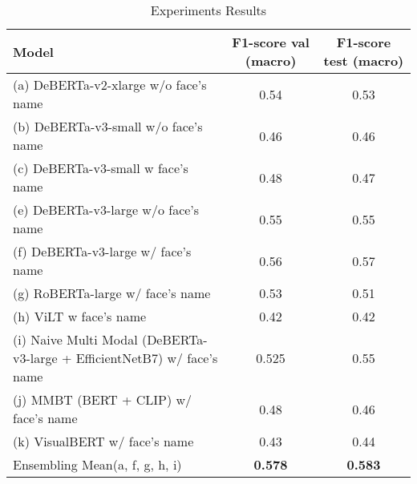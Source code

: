 \documentclass[11pt]{article}
\begin{document}
\begin{table*}
\centering
\begin{tabular}{ |p{8cm}||c||c| }
 \hline
 \textbf{Model} & \textbf{F1-score val (macro)} & \textbf{F1-score test (macro)} \\
 \hline
 (a) DeBERTa-v2-xlarge w/o face's name  & 0.54 & 0.53  \\  
 \hline
 (b) DeBERTa-v3-small w/o face's name  & 0.46 & 0.46  \\  
  \hline
 (c) DeBERTa-v3-small w face's name  & 0.48 & 0.47  \\  
  \hline
 (e) DeBERTa-v3-large w/o face's name  & 0.55 & 0.55  \\  
  \hline
 (f) DeBERTa-v3-large w/ face's name  & 0.56 & 0.57  \\  
  \hline
 (g) RoBERTa-large w/ face's name  & 0.53 & 0.51  \\  
 \hline
  \hline
  (h) ViLT w face's name  & 0.42 & 0.42  \\  
  \hline
 (i) Naive Multi Modal (DeBERTa-v3-large + EfficientNetB7) w/ face's name  & 0.525 & 0.55  \\
  \hline
 (j) MMBT (BERT + CLIP) w/ face's name  & 0.48 & 0.46  \\  
  \hline
 (k) VisualBERT w/ face's name  & 0.43 & 0.44  \\  
  \hline
 Ensembling Mean(a, f, g, h, i)  & \textbf{0.578} & \textbf{0.583}  \\  
  \hline
\end{tabular}
\caption{Experiments Results}
 \label{fig:results}
\end{table*}
\end{document}
